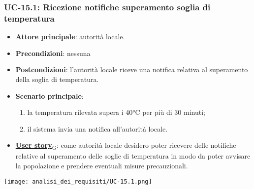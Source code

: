 \subsubsection{UC-15.1: Ricezione notifiche superamento soglia di temperatura}
\begin{itemize}
	\item \textbf{Attore principale}: autorità locale.
	\item \textbf{Precondizioni}: nessuna
	\item \textbf{Postcondizioni}: l'autorità locale riceve una notifica relativa al superamento della soglia di temperatura.
	\item \textbf{Scenario principale}:
	      \begin{enumerate}
		      \item la temperatura rilevata supera i 40°C per più di 30 minuti;
		      \item il sistema invia una notifica all'autorità locale.
	      \end{enumerate}
	\item \href{https://7last.github.io/docs/rtb/documentazione-interna/glossario\#user-story}{\textbf{User story}\textsubscript{G}}:
	      come autorità locale desidero poter ricevere delle notifiche relative al superamento delle soglie di temperatura
	      in modo da poter avvisare la popolazione e prendere eventuali misure precauzionali.
\end{itemize}
\begin{center}
	\texttt{[image: analisi\_dei\_requisiti/UC-15.1.png]}
\end{center}

\newpage

